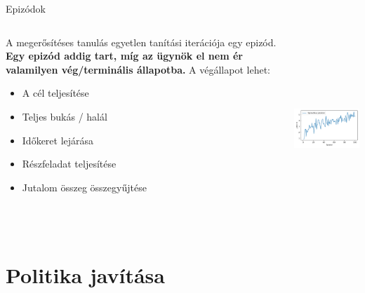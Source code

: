 \documentclass[english, aspectratio=169]{beamer}
\makeatletter
\let\origtableofcontents=\tableofcontents
\def\tableofcontents{\@ifnextchar[{\origtableofcontents}{\gobbletableofcontents}}
\def\gobbletableofcontents#1{\origtableofcontents}
\makeatother
\begin{document}
\begin{frame}{Epizódok}
\begin{columns}
\begin{column}{.5\textwidth}
A megerősítéses tanulás egyetlen tanítási iterációja egy epizód. \textbf{Egy epizód addig tart, míg az ügynök el nem ér valamilyen vég/terminális állapotba.} A végállapot lehet: 
\begin{itemize}
	\item A cél teljesítése
	\item Teljes bukás / halál
	\item Időkeret lejárása
	\item Részfeladat teljesítése
	\item Jutalom összeg összegyűjtése
\end{itemize}
\end{column}
\begin{column}{.5\textwidth}
\begin{center}
\includegraphics[width=7cm, height=7cm, keepaspectratio]{images/reinforcement_10.png}
\end{center}
\end{column}
\end{columns}
\end{frame}

\section{Politika javítása}

\begin{frame}
\tableofcontents[currentsection]
\end{frame}
\end{document}

